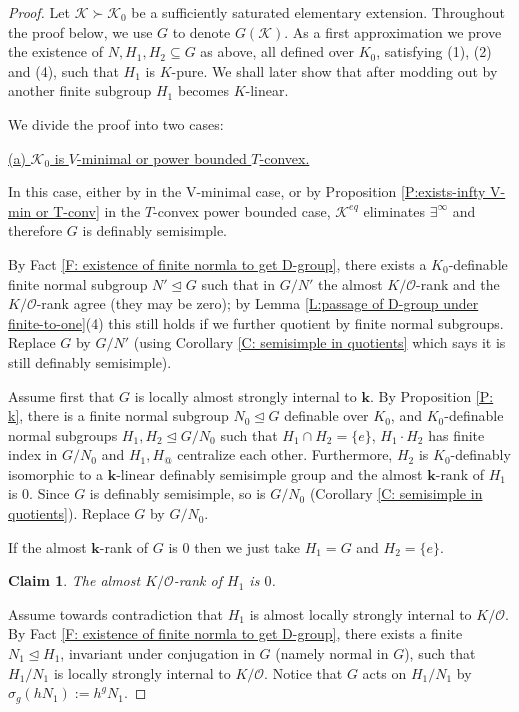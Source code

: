 \documentclass[11pt]{amsart}
\newtheorem{claim}{Claim}[theorem]
\theoremstyle{definition}
\newcommand{\bk}{\textbf{k}}
\newcommand{\CK}{{\mathcal K}}
\newcommand{\CO}{{\mathcal O}}
\newcommand{\0}{\emptyset}
\def\sub{\subseteq}
\newenvironment{claimproof}[1][\proofname]
  {%
    \proof[#1]%
      \renewcommand*\qedsymbol{$\square$ (claim)}%
  }
  {%
    \endproof%
  }
\begin{document}
\begin{proof}
Let $\CK\succ \CK_0$ be a sufficiently saturated elementary extension. Throughout the proof below, we use $G$ to denote $G(\CK)$. As a first approximation we prove the existence of $N, H_1,H_2\sub G$ as above, all defined over $K_0$, satisfying (1), (2) and (4), such that $H_1$ is $K$-pure. We shall later show that after modding out by another finite subgroup $H_1$ becomes $K$-linear.


We divide the proof into two cases:

\underline{(a) $\CK_0$ is $V$-minimal or power bounded $T$-convex.}
\vspace{.2cm} 

In this case, either by \cite[\S 3]{JohCminimalexist} in the V-minimal case, or by Proposition \ref{P:exists-infty V-min or T-conv} in the $T$-convex power bounded case, $\CK^{eq}$ eliminates $\exists^\infty$ and therefore $G$ is definably semisimple.


   By Fact \ref{F: existence of finite normla to get D-group}, there exists a $K_0$-definable finite normal subgroup $N'\trianglelefteq G$ such that in $G/N'$ the almost $K/\CO$-rank and the $K/\CO$-rank agree (they may be zero); by Lemma \ref{L:passage of D-group under finite-to-one}(4) this still holds if we further quotient by finite normal subgroups. Replace $G$ by $G/N'$ (using Corollary \ref{C: semisimple in quotients} which says it is still definably semisimple).

     Assume first that $G$ is locally almost strongly internal to $\bk$. 
    By Proposition \ref{P: k}, there is a finite normal subgroup $N_0\trianglelefteq G$ definable over $K_0$, and $K_0$-definable normal subgroups $H_1,H_2\trianglelefteq G/N_0$  such that $H_1\cap H_2=\{e\}$,  $H_1\cdot H_2$ has finite index in $G/N_0$ and $H_1, H_@$ centralize each other. Furthermore, $H_2$ is $K_0$-definably isomorphic to a $\bk$-linear definably semisimple group and the almost $\bk$-rank of $H_1$ is $0$. Since $G$ is definably semisimple, so is $G/N_0$ (Corollary \ref{C: semisimple in quotients}). Replace $G$ by $G/N_0$.

    If the almost $\bk$-rank of $G$ is $0$ then we just take $H_1=G$ and $H_2=\{e\}$. 

\begin{claim}
        The almost $K/\CO$-rank of $H_1$ is $0$.
    \end{claim}
    \begin{claimproof}
Assume towards contradiction that $H_1$ is almost locally strongly internal to $K/\CO$. By Fact \ref{F: existence of finite normla to get D-group}, there exists a finite $N_1\trianglelefteq H_1$,  invariant under conjugation in $G$ (namely normal in $G$), such that $H_1/N_1$ is locally strongly internal to $K/\CO$. Notice that $G$ acts on $H_1/N_1$ by $\sigma_g(hN_1):=h^gN_1$.


\end{claimproof}
\end{proof}
\end{document}
